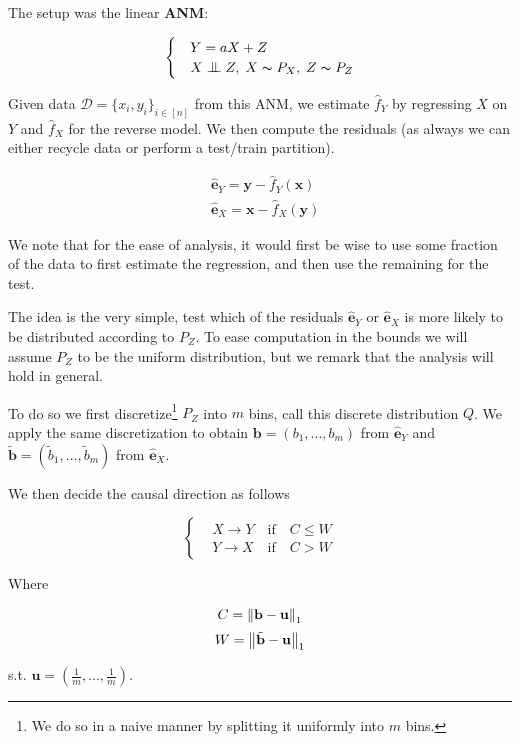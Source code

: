 The setup was the linear \textbf{ANM}:

\[ \begin{cases} 
    & Y = aX + Z  \\
    & X \bigCI Z,\; X \thicksim P_X,\; Z \thicksim P_{Z}  
 \end{cases}
\]

Given data $\mathcal{D} = \{x_i, y_i\}_{i \in [n]}$ from this ANM, we 
estimate $\hat{f}_Y$ by regressing $X$ on $Y$ and 
$\hat{f}_X$ for the reverse model. We then compute the residuals (as always we can 
either recycle data or perform a test/train partition). 

\begin{align}
    &  \hat{\mathbf{e}}_Y = \mathbf{y} - \hat{f}_Y(\mathbf{x})\\
    &  \hat{\mathbf{e}}_X = \mathbf{x} - \hat{f}_X(\mathbf{y})
\end{align}

We note that for the ease of analysis, it would first be wise to use some fraction 
of the data to first estimate the regression, and then use the remaining for the test.

The idea is the very simple, test which of the residuals $\hat{\mathbf{e}}_Y$ or 
$\hat{\mathbf{e}}_X$ is more likely to be distributed according to $P_Z$.
To ease computation in the bounds we will assume $P_Z$ to be the uniform
distribution, but we remark that the analysis will hold in general. 

To do so we first discretize\footnote{We do so in a naive manner by splitting
it uniformly into $m$ bins.} $P_{Z}$ into $m$ bins, call this discrete distribution
$Q$. We apply the same discretization to obtain $\mathbf{b} = (b_1, ..., b_m)$ from $\hat{\mathbf{e}}_Y$
and $\tilde{\mathbf{b}} = (\tilde{b}_1, ..., \tilde{b}_m)$ from $\hat{\mathbf{e}}_X$.

We then decide the causal direction as follows

\[ \begin{cases} 
    & X \rightarrow Y \quad \text{if} \quad C \leq W  \\
    & Y \rightarrow X \quad \text{if} \quad C > W  
 \end{cases}
\]

Where 

$$
    C = \left\lVert\mathbf{b} - \mathbf{u}\right\rVert_{1} 
$$
$$
    W = \left\lVert\tilde{\mathbf{b}} - \mathbf{u}\right\rVert_{1}
$$


s.t. $\mathbf{u} = (\frac{1}{m}, ..., \frac{1}{m})$.

